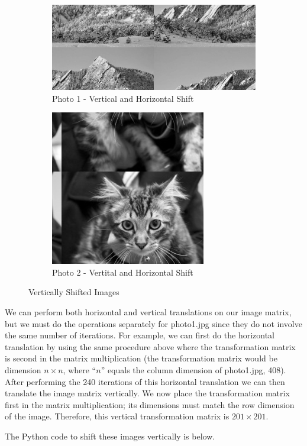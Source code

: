     \begin{figure}[ht]
      \centering
      \begin{subfigure}{0.6\textwidth}
        \centering
        \includegraphics[scale=0.5]{./img/vhsg1.png}
        \caption{Photo 1 - Vertical and Horizontal Shift}
        \label{fig:p1vg}
      \end{subfigure}
      \begin{subfigure}{0.3\textwidth}
        \centering
        \includegraphics[scale=0.5]{./img/vhsg2.png}
        \caption{Photo 2 - Vertital and Horizontal Shift}
        \label{fig:p2vg}
      \end{subfigure}
      \caption{Vertically Shifted Images}
      \label{fig:vs_images}
    \end{figure}

We can perform both horizontal and vertical translations on our image matrix, but we must do the operations separately for photo1.jpg since they do not involve the same number of iterations. For example, we can first do the horizontal translation by using the same procedure above where the transformation matrix is second in the matrix multiplication (the transformation matrix would be dimension $n \times n$, where “$n$” equals the column dimension of photo1.jpg, 408). After performing the 240 iterations of this horizontal translation we can then translate the image matrix vertically. We now place the transformation matrix first in the matrix multiplication; its dimensions must match the row dimension of the image. Therefore, this vertical transformation matrix is $201\times 201$.

The Python code to shift these images vertically is below.

    

